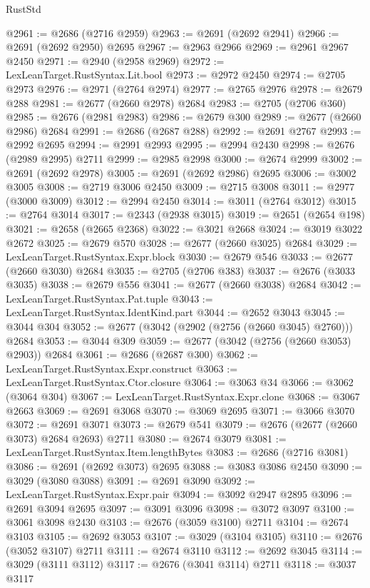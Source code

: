 \begin{lexlean}{RustStd}
\begin{coremodule}
{\begin{coremodule}
{{{{{{{{{{{{{{{{{{{{{{{{{{{{{{{{{{{{{{{{{{{{{{{{{{{{{{{@2961 := @2686 (@2716 @2959)
@2963 := @2691 (@2692 @2941)
@2966 := @2691 (@2692 @2950) @2695
@2967 := @2963 @2966
@2969 := @2961 @2967 @2450
@2971 := @2940 (@2958 @2969)
@2972 := LexLeanTarget.RustSyntax.Lit.bool
@2973 := @2972 @2450
@2974 := @2705 @2973
@2976 := @2971 (@2764 @2974)
@2977 := @2765 @2976
@2978 := @2679 @288
@2981 := @2677 (@2660 @2978) @2684
@2983 := @2705 (@2706 @360)
@2985 := @2676 (@2981 @2983)
@2986 := @2679 @300
@2989 := @2677 (@2660 @2986) @2684
@2991 := @2686 (@2687 @288)
@2992 := @2691 @2767
@2993 := @2992 @2695
@2994 := @2991 @2993
@2995 := @2994 @2430
@2998 := @2676 (@2989 @2995) @2711
@2999 := @2985 @2998
@3000 := @2674 @2999
@3002 := @2691 (@2692 @2978)
@3005 := @2691 (@2692 @2986) @2695
@3006 := @3002 @3005
@3008 := @2719 @3006 @2450
@3009 := @2715 @3008
@3011 := @2977 (@3000 @3009)
@3012 := @2994 @2450
@3014 := @3011 (@2764 @3012)
@3015 := @2764 @3014
@3017 := @2343 (@2938 @3015)
@3019 := @2651 (@2654 @198)
@3021 := @2658 (@2665 @2368)
@3022 := @3021 @2668
@3024 := @3019 @3022 @2672
@3025 := @2679 @570
@3028 := @2677 (@2660 @3025) @2684
@3029 := LexLeanTarget.RustSyntax.Expr.block
@3030 := @2679 @546
@3033 := @2677 (@2660 @3030) @2684
@3035 := @2705 (@2706 @383)
@3037 := @2676 (@3033 @3035)
@3038 := @2679 @556
@3041 := @2677 (@2660 @3038) @2684
@3042 := LexLeanTarget.RustSyntax.Pat.tuple
@3043 := LexLeanTarget.RustSyntax.IdentKind.part
@3044 := @2652 @3043
@3045 := @3044 @304
@3052 := @2677 (@3042 (@2902 (@2756 (@2660 @3045) @2760))) @2684
@3053 := @3044 @309
@3059 := @2677 (@3042 (@2756 (@2660 @3053) @2903)) @2684
@3061 := @2686 (@2687 @300)
@3062 := LexLeanTarget.RustSyntax.Expr.construct
@3063 := LexLeanTarget.RustSyntax.Ctor.closure
@3064 := @3063 @34
@3066 := @3062 (@3064 @304)
@3067 := LexLeanTarget.RustSyntax.Expr.clone
@3068 := @3067 @2663
@3069 := @2691 @3068
@3070 := @3069 @2695
@3071 := @3066 @3070
@3072 := @2691 @3071
@3073 := @2679 @541
@3079 := @2676 (@2677 (@2660 @3073) @2684 @2693) @2711
@3080 := @2674 @3079
@3081 := LexLeanTarget.RustSyntax.Item.lengthBytes
@3083 := @2686 (@2716 @3081)
@3086 := @2691 (@2692 @3073) @2695
@3088 := @3083 @3086 @2450
@3090 := @3029 (@3080 @3088)
@3091 := @2691 @3090
@3092 := LexLeanTarget.RustSyntax.Expr.pair
@3094 := @3092 @2947 @2895
@3096 := @2691 @3094 @2695
@3097 := @3091 @3096
@3098 := @3072 @3097
@3100 := @3061 @3098 @2430
@3103 := @2676 (@3059 @3100) @2711
@3104 := @2674 @3103
@3105 := @2692 @3053
@3107 := @3029 (@3104 @3105)
@3110 := @2676 (@3052 @3107) @2711
@3111 := @2674 @3110
@3112 := @2692 @3045
@3114 := @3029 (@3111 @3112)
@3117 := @2676 (@3041 @3114) @2711
@3118 := @3037 @3117
}}}}}}}}}}}}}}}}}}}}}}}}}}}}}}}}}}}}}}}}}}}}}}}}}}}}}}}
\end{coremodule}}
\end{coremodule}
\end{lexlean}
